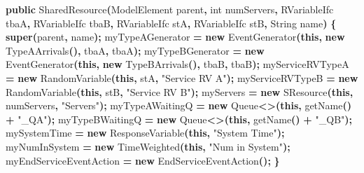 \documentclass[
]{book}
\newenvironment{Shaded}{\begin{snugshade}}{\end{snugshade}}
\newcommand{\BuiltInTok}[1]{#1}
\newcommand{\DataTypeTok}[1]{\textcolor[rgb]{0.13,0.29,0.53}{#1}}
\newcommand{\FunctionTok}[1]{\textcolor[rgb]{0.00,0.00,0.00}{#1}}
\newcommand{\KeywordTok}[1]{\textcolor[rgb]{0.13,0.29,0.53}{\textbf{#1}}}
\newcommand{\NormalTok}[1]{#1}
\newcommand{\OperatorTok}[1]{\textcolor[rgb]{0.81,0.36,0.00}{\textbf{#1}}}
\newcommand{\StringTok}[1]{\textcolor[rgb]{0.31,0.60,0.02}{#1}}
\theoremstyle{definition}
\theoremstyle{definition}
\theoremstyle{definition}
\theoremstyle{definition}
\theoremstyle{remark}
\begin{document}
\begin{Shaded}
\begin{Highlighting}[]
    \KeywordTok{public} \FunctionTok{SharedResource}\OperatorTok{(}\NormalTok{ModelElement parent}\OperatorTok{,} \DataTypeTok{int}\NormalTok{ numServers}\OperatorTok{,}\NormalTok{ RVariableIfc tbaA}\OperatorTok{,}
\NormalTok{                          RVariableIfc tbaB}\OperatorTok{,}\NormalTok{ RVariableIfc stA}\OperatorTok{,}\NormalTok{ RVariableIfc stB}\OperatorTok{,} \BuiltInTok{String}\NormalTok{ name}\OperatorTok{)} \OperatorTok{\{}
        \KeywordTok{super}\OperatorTok{(}\NormalTok{parent}\OperatorTok{,}\NormalTok{ name}\OperatorTok{);}
\NormalTok{        myTypeAGenerator }\OperatorTok{=} \KeywordTok{new} \FunctionTok{EventGenerator}\OperatorTok{(}\KeywordTok{this}\OperatorTok{,} \KeywordTok{new} \FunctionTok{TypeAArrivals}\OperatorTok{(),}\NormalTok{ tbaA}\OperatorTok{,}\NormalTok{ tbaA}\OperatorTok{);}
\NormalTok{        myTypeBGenerator }\OperatorTok{=} \KeywordTok{new} \FunctionTok{EventGenerator}\OperatorTok{(}\KeywordTok{this}\OperatorTok{,} \KeywordTok{new} \FunctionTok{TypeBArrivals}\OperatorTok{(),}\NormalTok{ tbaB}\OperatorTok{,}\NormalTok{ tbaB}\OperatorTok{);}
\NormalTok{        myServiceRVTypeA }\OperatorTok{=} \KeywordTok{new} \FunctionTok{RandomVariable}\OperatorTok{(}\KeywordTok{this}\OperatorTok{,}\NormalTok{ stA}\OperatorTok{,} \StringTok{"Service RV A"}\OperatorTok{);}
\NormalTok{        myServiceRVTypeB }\OperatorTok{=} \KeywordTok{new} \FunctionTok{RandomVariable}\OperatorTok{(}\KeywordTok{this}\OperatorTok{,}\NormalTok{ stB}\OperatorTok{,} \StringTok{"Service RV B"}\OperatorTok{);}
\NormalTok{        myServers }\OperatorTok{=} \KeywordTok{new} \FunctionTok{SResource}\OperatorTok{(}\KeywordTok{this}\OperatorTok{,}\NormalTok{ numServers}\OperatorTok{,} \StringTok{"Servers"}\OperatorTok{);}
\NormalTok{        myTypeAWaitingQ }\OperatorTok{=} \KeywordTok{new} \BuiltInTok{Queue}\OperatorTok{\textless{}\textgreater{}(}\KeywordTok{this}\OperatorTok{,} \FunctionTok{getName}\OperatorTok{()} \OperatorTok{+} \StringTok{"\_QA"}\OperatorTok{);}
\NormalTok{        myTypeBWaitingQ }\OperatorTok{=} \KeywordTok{new} \BuiltInTok{Queue}\OperatorTok{\textless{}\textgreater{}(}\KeywordTok{this}\OperatorTok{,} \FunctionTok{getName}\OperatorTok{()} \OperatorTok{+} \StringTok{"\_QB"}\OperatorTok{);}
\NormalTok{        mySystemTime }\OperatorTok{=} \KeywordTok{new} \FunctionTok{ResponseVariable}\OperatorTok{(}\KeywordTok{this}\OperatorTok{,} \StringTok{"System Time"}\OperatorTok{);}
\NormalTok{        myNumInSystem }\OperatorTok{=} \KeywordTok{new} \FunctionTok{TimeWeighted}\OperatorTok{(}\KeywordTok{this}\OperatorTok{,} \StringTok{"Num in System"}\OperatorTok{);}
\NormalTok{        myEndServiceEventAction }\OperatorTok{=} \KeywordTok{new} \FunctionTok{EndServiceEventAction}\OperatorTok{();}
    \OperatorTok{\}}
\end{Highlighting}
\end{Shaded}
\end{document}
